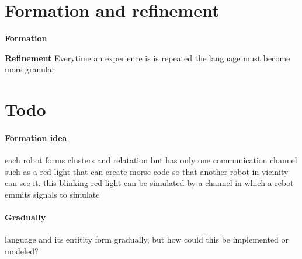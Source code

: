     \section{Formation and refinement}
        \textbf{Formation}

        \textbf{Refinement} Everytime an experience is is repeated the language must become more granular








\section{Todo}
    \paragraph{Formation idea}
        each robot  forms clusters and relatation but has only one communication channel such as a red light that can create morse code so that another robot in vicinity can see it. this blinking red light can be simulated by a channel in which a rebot emmits signals to simulate

    \paragraph{Gradually}
        language and its entitity form gradually, but how could this be implemented or modeled?


